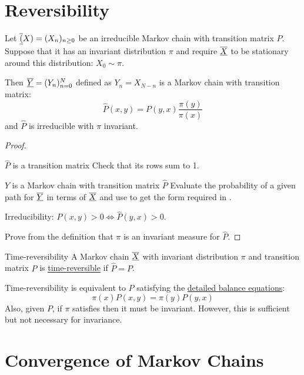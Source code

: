 \documentclass[../Main.tex]{subfiles}
\begin{document}
\section{Reversibility}
\begin{proposition}
    Let $\underline{\overline{(}}X) = (X_n)_{n \geq 0}$ be an irreducible Markov chain with transition matrix $P$. Suppose that it has an invariant distribution $\pi$ and require $\underline{\overline{X}}$ to be stationary around this distribution: $X_0 \sim \pi$.

    Then $\underline{\overline{Y}} = (Y_n)_{n = 0}^N$ defined as $Y_n = X_{N -n}$ is a Markov chain with transition matrix:
    \begin{equation}
        \hat{P}(x, y) = P(y, x) \frac{\pi(y)}{\pi(x)}
        \label{eqnTimeReverseMatrix}
    \end{equation}
    and $\hat{P}$ is irreducible with $\pi$ invariant.
    \label{propTimeReverseMatrix}
\end{proposition}
\begin{proof}
    \begin{subproof}{$\hat{P}$ is a transition matrix}
        Check that its rows sum to 1.
    \end{subproof}
    \begin{subproof}{$Y$ is a Markov chain with transition matrix $\hat{P}$}
        Evaluate the probability of a given path for $\underline{\overline{Y}}$ in terms of $\underline{\overline{X}}$ and use  to get the form required in .
    \end{subproof}
    Irreducibility: $P(x, y) > 0 \iff \hat{P}(y, x) > 0$.

    Prove from the definition that $\pi$ is an invariant measure for $\hat{P}$.
\end{proof}
\begin{definition}{Time-reversibility}
    A Markov chain $\underline{\overline{X}}$ with invariant distribution $\pi$ and transition matrix $P$ is \underline{time-reversible} if $\hat{P} = P$.
\end{definition}
Time-reversibility is equivalent to $P$ satisfying the \underline{detailed balance equations}:
\begin{equation}
    \pi(x) P(x, y) = \pi(y) P(y, x)
    \label{eqnDetailedBalance}
\end{equation}
Also, given $P$, if $\pi$ satisfies  then it must be invariant. However, this is sufficient but not necessary for invariance.
\section{Convergence of Markov Chains}
\end{document}
